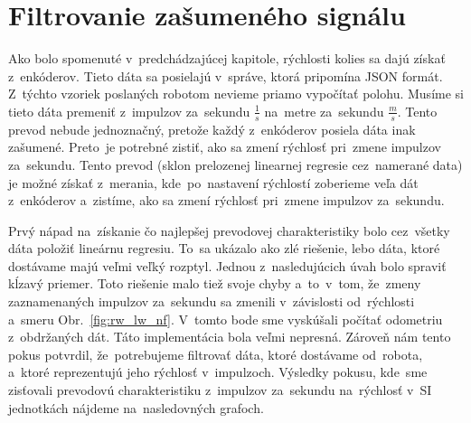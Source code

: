 \section{Filtrovanie zašumeného signálu}
\label{sec:ziskavanieRychlosti}

Ako bolo spomenuté v~predchádzajúcej kapitole, rýchlosti kolies sa dajú získať z~enkóderov. Tieto dáta sa posielajú v~správe, ktorá pripomína JSON formát.
Z~týchto vzoriek poslaných robotom nevieme priamo vypočítať polohu. Musíme si tieto dáta premeniť z~impulzov za~sekundu \(\frac{1}{s}\) na~metre
za~sekundu \(\frac{m}{s}\). Tento prevod nebude jednoznačný, pretože každý z~enkóderov posiela dáta inak zašumené. Preto~je potrebné zistiť, ako sa zmení
rýchlosť pri~zmene impulzov za~sekundu. Tento prevod (sklon prelozenej linearnej regresie cez~namerané data) je možné získať z~merania, kde~po~nastavení
rýchlostí zoberieme veľa dát z~enkóderov a~zistíme, ako sa zmení rýchlosť pri~zmene impulzov za~sekundu.

Prvý nápad na~získanie čo najlepšej prevodovej charakteristiky bolo cez~všetky dáta položiť lineárnu regresiu. To~sa ukázalo ako zlé riešenie, lebo dáta,
ktoré dostávame majú veľmi veľký rozptyl. Jednou z~nasledujúcich úvah bolo spraviť kĺzavý priemer. Toto riešenie malo tiež svoje chyby a~to~v~tom, že~zmeny
zaznamenaných impulzov za~sekundu sa zmenili v~závislosti od~rýchlosti a~smeru Obr.~\ref{fig:rw_lw_nf}. V~tomto bode sme vyskúšali počítať odometriu
z~obdržaných dát. Táto implementácia bola veľmi nepresná. Zároveň nám tento pokus potvrdil, že~potrebujeme filtrovať dáta, ktoré dostávame
od~robota, a~ktoré reprezentujú jeho rýchlosť v~impulzoch. Výsledky pokusu, kde~sme zisťovali prevodovú charakteristiku z~impulzov za~sekundu na~rýchlosť
v~SI jednotkách nájdeme na~nasledovných grafoch.

